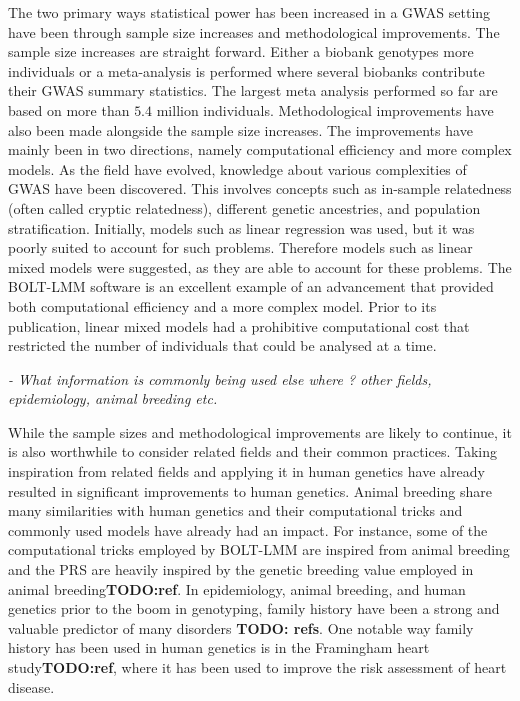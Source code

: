 The two primary ways statistical power has been increased in a GWAS setting have been through sample size increases and methodological improvements. The sample size increases are straight forward. Either a biobank genotypes more individuals or a meta-analysis is performed where several biobanks contribute their GWAS summary statistics. The largest meta analysis performed so far are based on more than $ 5.4 $ million individuals\cite{yengo2022saturated}. Methodological improvements have also been made alongside the sample size increases. The improvements have mainly been in two directions, namely computational efficiency and more complex models. As the field have evolved, knowledge about various complexities of GWAS have been discovered. This involves concepts such as in-sample relatedness (often called cryptic relatedness), different genetic ancestries, and population stratification. Initially, models such as linear regression was used, but it was poorly suited to account for such problems. Therefore models such as linear mixed models were suggested, as they are able to account for these problems. The BOLT-LMM\cite{loh2015efficient} software is an excellent example of an advancement that provided both computational efficiency and a more complex model. Prior to its publication, linear mixed models had a prohibitive computational cost that restricted the number of individuals that could be analysed at a time.%

{\itshape
- What information is commonly being used else where ? other fields, epidemiology, animal breeding etc.
}

While the sample sizes and methodological improvements are likely to continue, it is also worthwhile to consider related fields and their common practices. Taking inspiration from related fields and applying it in human genetics have already resulted in significant improvements to human genetics. Animal breeding share many similarities with human genetics and their computational tricks and commonly used models have already had an impact. For instance, some of the computational tricks employed by BOLT-LMM are inspired from animal breeding and the PRS are heavily inspired by the genetic breeding value employed in animal breeding\textbf{TODO:ref}. In epidemiology, animal breeding, and human genetics prior to the boom in genotyping, family history have been a strong and valuable predictor of many disorders \textbf{TODO: refs}. One notable way family history has been used in human genetics is in the Framingham heart study\textbf{TODO:ref}, where it has been used to improve the risk assessment of heart disease.


